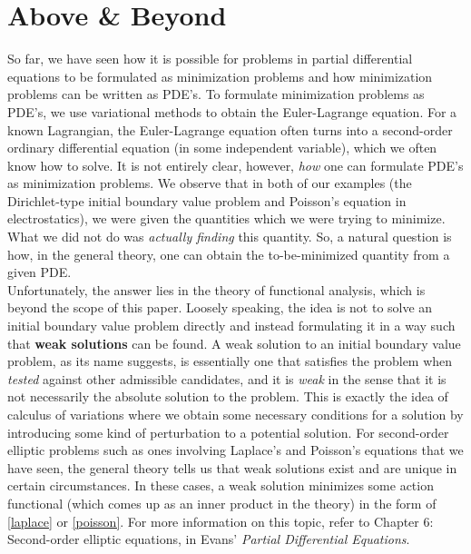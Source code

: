 \documentclass{article}
\begin{document}
\section{Above \& Beyond}

So far, we have seen how it is possible for problems in partial differential equations to be formulated as minimization problems and how minimization problems can be written as PDE's. To formulate minimization problems as PDE's, we use variational methods to obtain the Euler-Lagrange equation. For a known Lagrangian, the Euler-Lagrange equation often turns into a second-order ordinary differential equation (in some independent variable), which we often know how to solve. It is not entirely clear, however, \textit{how} one can formulate PDE's as minimization problems. We observe that in both of our examples (the Dirichlet-type initial boundary value problem and Poisson's equation in electrostatics), we were given the quantities which we were trying to minimize. What we did not do was \textit{actually finding} this quantity. So, a natural question is how, in the general theory, one can obtain the to-be-minimized quantity from a given PDE.  \\

Unfortunately, the answer lies in the theory of functional analysis, which is beyond the scope of this paper. Loosely speaking, the idea is not to solve an initial boundary value problem directly and instead formulating it in a way such that \textbf{weak solutions} can be found. A weak solution to an initial boundary value problem, as its name suggests, is essentially one that satisfies the problem when \textit{tested} against other admissible candidates, and it is \textit{weak} in the sense that it is not necessarily the absolute solution to the problem. This is exactly the idea of calculus of variations where we obtain some necessary conditions for a solution by introducing some kind of perturbation to a potential solution. For second-order elliptic problems such as ones involving Laplace's and Poisson's equations that we have seen, the general theory tells us that weak solutions exist and are unique in certain circumstances. In these cases, a weak solution minimizes some action functional (which comes up as an inner product in the theory) in the form of \eqref{laplace} or \eqref{poisson}. For more information on this topic, refer to Chapter 6: Second-order elliptic equations, in Evans' \textit{Partial Differential Equations}. 
\end{document}
